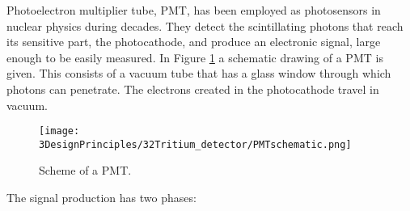 Photoelectron multiplier tube, PMT, has been employed as photosensors in nuclear physics during decades. They detect the scintillating photons that reach its sensitive part, the photocathode, and produce an electronic signal, large enough to be easily measured. In Figure \ref{fig:SchemePMT} a schematic drawing of a PMT is given. This consists of a vacuum tube that has a glass window through which photons can penetrate. The electrons created in the photocathode travel in vacuum. 

\begin{figure}[htbp]
\centering
\texttt{[image: 3DesignPrinciples/32Tritium\_detector/PMTschematic.png]}
\caption{Scheme of a PMT.\label{fig:SchemePMT}~\cite{Knoll}}
\end{figure}

The signal production has two phases:
